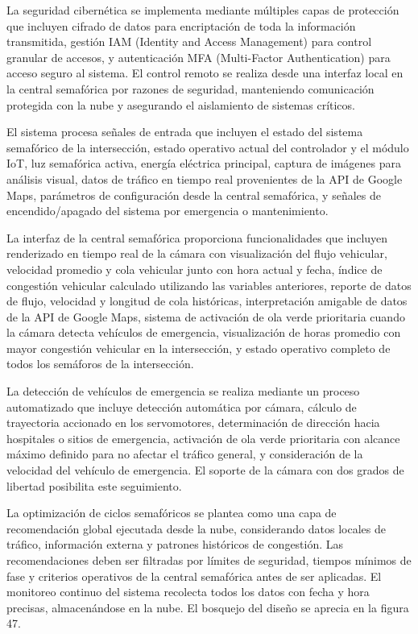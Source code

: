 \documentclass[12pt,a4paper,oneside]{report}
\begin{document}
La seguridad cibernética se implementa mediante múltiples capas de protección que incluyen cifrado de datos para encriptación de toda la información transmitida, gestión IAM (Identity and Access Management) para control granular de accesos, y autenticación MFA (Multi-Factor Authentication) para acceso seguro al sistema. El control remoto se realiza desde una interfaz local en la central semafórica por razones de seguridad, manteniendo comunicación protegida con la nube y asegurando el aislamiento de sistemas críticos.

El sistema procesa señales de entrada que incluyen el estado del sistema semafórico de la intersección, estado operativo actual del controlador y el módulo IoT, luz semafórica activa, energía eléctrica principal, captura de imágenes para análisis visual, datos de tráfico en tiempo real provenientes de la API de Google Maps, parámetros de configuración desde la central semafórica, y señales de encendido/apagado del sistema por emergencia o mantenimiento.

La interfaz de la central semafórica proporciona funcionalidades que incluyen renderizado en tiempo real de la cámara con visualización del flujo vehicular, velocidad promedio y cola vehicular junto con hora actual y fecha, índice de congestión vehicular calculado utilizando las variables anteriores, reporte de datos de flujo, velocidad y longitud de cola históricas, interpretación amigable de datos de la API de Google Maps, sistema de activación de ola verde prioritaria cuando la cámara detecta vehículos de emergencia, visualización de horas promedio con mayor congestión vehicular en la intersección, y estado operativo completo de todos los semáforos de la intersección.

La detección de vehículos de emergencia se realiza mediante un proceso automatizado que incluye detección automática por cámara, cálculo de trayectoria accionado en los servomotores, determinación de dirección hacia hospitales o sitios de emergencia, activación de ola verde prioritaria con alcance máximo definido para no afectar el tráfico general, y consideración de la velocidad del vehículo de emergencia. El soporte de la cámara con dos grados de libertad posibilita este seguimiento.

La optimización de ciclos semafóricos se plantea como una capa de recomendación global ejecutada desde la nube, considerando datos locales de tráfico, información externa y patrones históricos de congestión. Las recomendaciones deben ser filtradas por límites de seguridad, tiempos mínimos de fase y criterios operativos de la central semafórica antes de ser aplicadas. El monitoreo continuo del sistema recolecta todos los datos con fecha y hora precisas, almacenándose en la nube. El bosquejo del diseño se aprecia en la figura 47.
\end{document}
